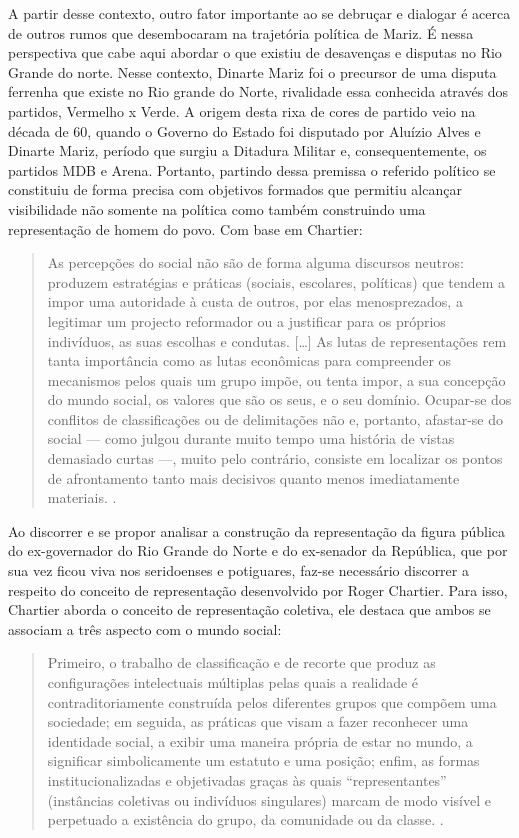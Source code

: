\begin{refsection}
    A partir desse contexto, outro fator importante ao se debruçar e dialogar é acerca de outros rumos que desembocaram na trajetória política de Mariz. É nessa perspectiva que cabe aqui abordar o que existiu de desavenças e disputas no Rio Grande do norte. Nesse contexto, Dinarte Mariz foi o precursor de uma disputa ferrenha que existe no Rio grande do Norte, rivalidade essa conhecida através dos partidos, Vermelho x Verde. A origem desta rixa de cores de partido veio na década de 60, quando o Governo do Estado foi disputado por Aluízio Alves e Dinarte Mariz, período que surgiu a Ditadura Militar e, consequentemente, os partidos MDB e Arena. Portanto, partindo dessa premissa o referido político se constituiu de forma precisa com objetivos formados que permitiu alcançar visibilidade não somente na política como também construindo uma representação de homem do povo. Com base em Chartier:

    \begin{quotation}
        As percepções do social não são de forma alguma discursos neutros: produzem estratégias e práticas (sociais, escolares, políticas) que tendem a impor uma autoridade à custa de outros, por elas menosprezados, a legitimar um projecto reformador ou a justificar para os próprios indivíduos, as suas escolhas e condutas. [\dots] As lutas de representações rem tanta importância como as lutas econômicas para compreender os mecanismos pelos quais um grupo impõe, ou tenta impor, a sua concepção do mundo social, os valores que são os seus, e o seu domínio. Ocupar-se dos conflitos de classificações ou de delimitações não e, portanto, afastar-se do social --- como julgou durante muito tempo uma história de vistas demasiado curtas ---, muito pelo contrário, consiste em localizar os pontos de afrontamento tanto mais decisivos quanto menos imediatamente materiais. \cite[p.~17]{Chartier1990Historia}.
    \end{quotation}

    Ao discorrer e se propor analisar a construção da representação da figura pública do ex-governador do Rio Grande do Norte e do ex-senador da República, que por sua vez ficou viva nos seridoenses e potiguares, faz-se necessário discorrer a respeito do conceito de representação desenvolvido por Roger Chartier. Para isso, Chartier aborda o conceito de representação coletiva, ele destaca que ambos se associam a três aspecto com o mundo social:

    \begin{quotation}
        Primeiro, o trabalho de classificação e de recorte que produz as configurações intelectuais múltiplas pelas quais a realidade é contraditoriamente construída pelos diferentes grupos que compõem uma sociedade; em seguida, as práticas que visam a fazer reconhecer uma identidade  social, a exibir uma maneira própria de estar no mundo, a significar simbolicamente um estatuto e uma posição; enfim, as formas institucionalizadas e objetivadas graças às quais ``representantes'' (instâncias coletivas ou indivíduos singulares) marcam de modo visível e perpetuado a existência do grupo, da comunidade ou da classe. \cite[p.~73]{Chartier1990Historia}.
    \end{quotation}


\end{refsection}
